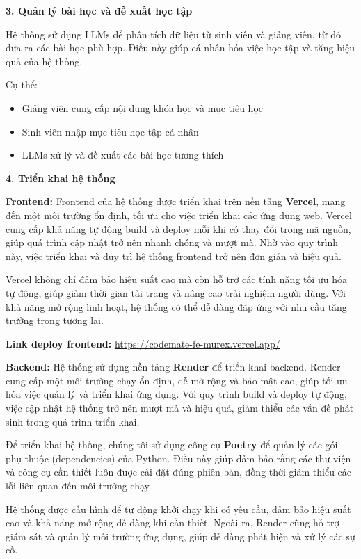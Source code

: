 \textbf{3. Quản lý bài học và đề xuất học tập} 

Hệ thống sử dụng LLMs để phân tích dữ liệu từ sinh viên và giảng viên, từ đó đưa ra các bài học phù hợp. Điều này giúp cá nhân hóa việc học tập và tăng hiệu quả của hệ thống.

Cụ thể:

\begin{itemize}
    \item Giảng viên cung cấp nội dung khóa học và mục tiêu học
    \item Sinh viên nhập mục tiêu học tập cá nhân
    \item LLMs xử lý và đề xuất các bài học tương thích
\end{itemize}

\textbf{4. Triển khai hệ thống}

\textbf{Frontend:}
Frontend của hệ thống được triển khai trên nền tảng \textbf{Vercel}, mang đến một môi trường ổn định, tối ưu cho việc triển khai các ứng dụng web. Vercel cung cấp khả năng tự động build và deploy mỗi khi có thay đổi trong mã nguồn, giúp quá trình cập nhật trở nên nhanh chóng và mượt mà. Nhờ vào quy trình này, việc triển khai và duy trì hệ thống frontend trở nên đơn giản và hiệu quả.

Vercel không chỉ đảm bảo hiệu suất cao mà còn hỗ trợ các tính năng tối ưu hóa tự động, giúp giảm thời gian tải trang và nâng cao trải nghiệm người dùng. Với khả năng mở rộng linh hoạt, hệ thống có thể dễ dàng đáp ứng với nhu cầu tăng trưởng trong tương lai.

\par \textbf{Link deploy frontend:} \textcolor{blue}{\href{https://codemate-fe-murex.vercel.app/}{https://codemate-fe-murex.vercel.app/}}

\textbf{Backend:}
Hệ thống sử dụng nền tảng \textbf{Render} để triển khai backend. Render cung cấp một môi trường chạy ổn định, dễ mở rộng và bảo mật cao, giúp tối ưu hóa việc quản lý và triển khai ứng dụng. Với quy trình build và deploy tự động, việc cập nhật hệ thống trở nên mượt mà và hiệu quả, giảm thiểu các vấn đề phát sinh trong quá trình triển khai.

Để triển khai hệ thống, chúng tôi sử dụng công cụ \textbf{Poetry} để quản lý các gói phụ thuộc (dependencies) của Python. Điều này giúp đảm bảo rằng các thư viện và công cụ cần thiết luôn được cài đặt đúng phiên bản, đồng thời giảm thiểu các lỗi liên quan đến môi trường chạy.

Hệ thống được cấu hình để tự động khởi chạy khi có yêu cầu, đảm bảo hiệu suất cao và khả năng mở rộng dễ dàng khi cần thiết. Ngoài ra, Render cũng hỗ trợ giám sát và quản lý môi trường ứng dụng, giúp dễ dàng phát hiện và xử lý các sự cố.

